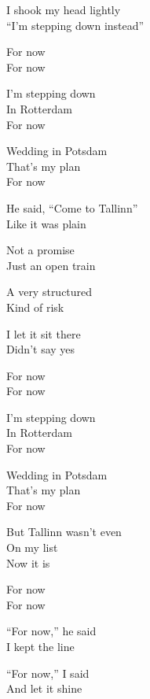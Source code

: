 \begin{lyrics}
I shook my head lightly\\
“I’m stepping down instead”

For now\\
For now

I’m stepping down\\
In Rotterdam\\
For now

Wedding in Potsdam\\
That’s my plan\\
For now

He said, “Come to Tallinn”\\
Like it was plain

Not a promise\\
Just an open train

A very structured\\
Kind of risk

I let it sit there\\
Didn’t say yes

For now\\
For now

I’m stepping down\\
In Rotterdam\\
For now

Wedding in Potsdam\\
That’s my plan\\
For now

But Tallinn wasn’t even\\
On my list\\
Now it is

For now\\
For now

“For now,” he said\\
I kept the line

“For now,” I said\\
And let it shine
\end{lyrics}

